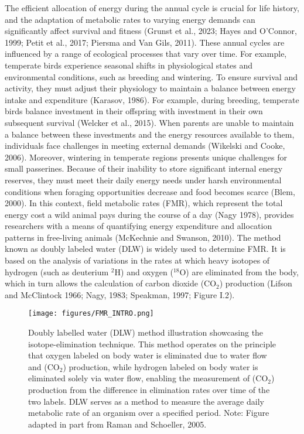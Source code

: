 \documentclass[10pt, twoside]{book} %
\begin{document}
\noindent The efficient allocation of energy during the annual cycle is crucial for life history, and the adaptation of metabolic rates to varying energy demands can significantly affect survival and fitness (Grunst et al., 2023; Hayes and O'Connor, 1999; Petit et al., 2017; Piersma and Van Gils, 2011). These annual cycles are influenced by a range of ecological processes that vary over time. For example, temperate birds experience seasonal shifts in physiological states and environmental conditions, such as breeding and wintering. To ensure survival and activity, they must adjust their physiology to maintain a balance between energy intake and expenditure (Karasov, 1986). For example, during breeding, temperate birds balance investment in their offspring with investment in their own subsequent survival (Welcker et al., 2015). When parents are unable to maintain a balance between these investments and the energy resources available to them, individuals face challenges in meeting external demands (Wikelski and Cooke, 2006). Moreover, wintering in temperate regions presents unique challenges for small passerines. Because of their inability to store significant internal energy reserves, they must meet their daily energy needs under harsh environmental conditions when foraging opportunities decrease and food becomes scarce (Blem, 2000). In this context, field metabolic rates (FMR), which represent the total energy cost a wild animal pays during the course of a day (Nagy 1978), provides researchers with a means of quantifying energy expenditure and allocation patterns in free-living animals (McKechnie and Swanson, 2010). The method known as doubly labeled water (DLW) is widely used to determine FMR. It is based on the analysis of variations in the rates at which heavy isotopes of hydrogen (such as deuterium ${}^{2}$H) and oxygen (${}^{18}$O) are eliminated from the body, which in turn allows the calculation of carbon dioxide (CO$_{\text{2}}$) production (Lifson and McClintock 1966; Nagy, 1983; Speakman, 1997; Figure I.2).\\

	\renewcommand{\thefigure}{I.\arabic{figure}}
	\begin{figure}[h!]
		\begin{center}
			\texttt{[image: figures/FMR\_INTRO.png]}
		\end{center}
		\begin{footnotesize}
			\caption{Doubly labelled water (DLW) method illustration showcasing the isotope-elimination technique. This method operates on the principle that oxygen labeled on body water is eliminated due to water flow and (CO$_{\text{2}}$) production, while hydrogen labeled on body water is eliminated solely via water flow, enabling the measurement of (CO$_{\text{2}}$) production from the difference in elimination rates over time of the two labels. DLW serves as a method to measure the average daily metabolic rate of an organism over a specified period. Note: Figure adapted in part from Raman and Schoeller, 2005. \label{figI.2}}
		\end{footnotesize}
	\end{figure}
\end{document}
